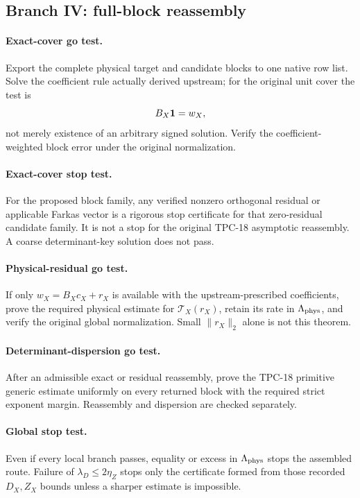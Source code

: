 \subsection{Branch IV: full-block reassembly}

\paragraph{Exact-cover go test.}
Export the complete physical target and candidate blocks to one
native row list.  Solve the coefficient rule actually derived
upstream; for the original unit cover the test is
\[
 B_X\mathbf 1=w_X,
\]
not merely existence of an arbitrary signed solution.  Verify the
coefficient-weighted block error under the original normalization.

\paragraph{Exact-cover stop test.}
For the proposed block family, any verified nonzero orthogonal
residual or applicable Farkas vector is a rigorous stop certificate
for that zero-residual candidate family.  It is not a stop for the
original TPC-18 asymptotic reassembly.  A coarse determinant-key
solution does not pass.

\paragraph{Physical-residual go test.}
If only \(w_X=B_Xc_X+r_X\) is available with the upstream-prescribed
coefficients, prove the required physical estimate for
\(\mathcal T_X(r_X)\), retain its rate in
\(\Lambda_{\rm phys}\), and verify the original global normalization.
Small \(\|r_X\|_2\) alone is not this theorem.

\paragraph{Determinant-dispersion go test.}
After an admissible exact or residual reassembly, prove the TPC-18
primitive generic estimate uniformly on every returned block with the
required strict exponent margin.  Reassembly and dispersion are
checked separately.

\paragraph{Global stop test.}
Even if every local branch passes, equality or excess in
\(\Lambda_{\rm phys}\) stops the assembled route.  Failure of
\(\lambda_D\le2\eta_Z\) stops only the certificate formed from those
recorded \(D_X,Z_X\) bounds unless a sharper estimate is impossible.

